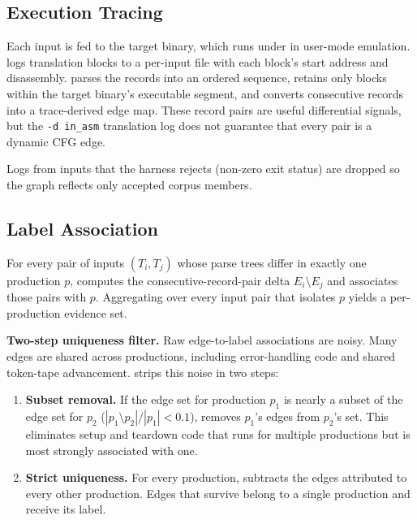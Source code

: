\subsection{Execution Tracing}\label{sec:design:trace}

Each input is fed to the target binary, which runs under \QEMU in user-mode emulation.
\QEMU logs translation blocks to a per-input file with each block's start address and disassembly.
\toolname parses the records into an ordered sequence, retains only blocks within the target binary's executable segment, and converts consecutive records into a trace-derived edge map.
These record pairs are useful differential signals, but the \texttt{-d in\_asm} translation log does not guarantee that every pair is a dynamic CFG edge.

Logs from inputs that the harness rejects (non-zero exit status) are dropped so the graph reflects only accepted corpus members.

\subsection{Label Association}\label{sec:design:assoc}

For every pair of inputs $(T_i, T_j)$ whose parse trees differ in exactly one production $p$, \toolname computes the consecutive-record-pair delta $E_i \setminus E_j$ and associates those pairs with $p$.
Aggregating over every input pair that isolates $p$ yields a per-production evidence set.

\textbf{Two-step uniqueness filter.}
Raw edge-to-label associations are noisy.
Many edges are shared across productions, including error-handling code and shared token-tape advancement.
\toolname strips this noise in two steps:

\begin{enumerate}
    \item \textbf{Subset removal.} If the edge set for production $p_1$ is nearly a subset of the edge set for $p_2$ ($|p_1 \setminus p_2| / |p_1| < 0.1$), \toolname removes $p_1$'s edges from $p_2$'s set. This eliminates setup and teardown code that runs for multiple productions but is most strongly associated with one.
    \item \textbf{Strict uniqueness.} For every production, \toolname subtracts the edges attributed to every other production. Edges that survive belong to a single production and receive its label.
\end{enumerate}

